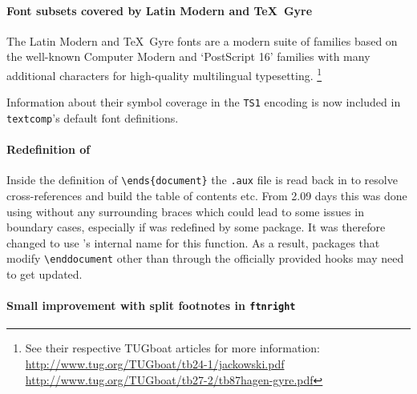 \documentclass{ltnews}
\begin{document}
\paragraph{Font subsets covered by Latin Modern and \TeX\ Gyre}

The Latin Modern and \TeX\ Gyre fonts are a modern suite of families based
on the well-known Computer Modern and `PostScript 16' families with many additional
characters for high-quality multilingual typesetting.%
\footnote{%
  See their respective TUGboat articles for more information:\\
  \url{http://www.tug.org/TUGboat/tb24-1/jackowski.pdf}\\
  \url{http://www.tug.org/TUGboat/tb27-2/tb87hagen-gyre.pdf}%
}

Information about their symbol coverage in the \verb|TS1| encoding is now included
in \texttt{textcomp}'s default font definitions.



\paragraph{Redefinition of }

Inside the definition of \verb=\ends{document}= the \texttt{.aux} file is read back in to resolve cross-references and build the table of contents etc. From 2.09 days this was done using \verb== without any surrounding braces which could lead to some issues in boundary cases, especially if \verb== was redefined by some package. It was therefore changed to use \LaTeXe{}'s internal name for this function. As a result, packages that modify \verb=\enddocument= other than through the officially provided hooks may need to get updated.

\paragraph{Small improvement with split footnotes in \texttt{ftnright}}
\end{document}
